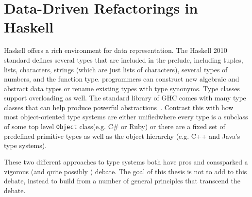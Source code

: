 \DIFdelbegin %
{%
\texttt{}%
}
\DIFdelend %
\section{Data-Driven Refactorings in Haskell}

Haskell offers a rich environment for data representation. The Haskell 2010 standard defines several types that are included in the prelude, including tuples, lists, characters, strings (which are just lists of characters), several types of numbers, and the function type. \DIFdelbegin {}\DIFdelend \DIFaddbegin {}\DIFaddend programmers can construct new \DIFdelbegin {}\DIFdelend algebraic and abstract data types or rename existing types with type synonyms. Type classes support overloading as well. The standard library of GHC comes with many type classes that can help produce powerful abstractions~\citep{typeclassopedia}. Contrast this with how most object-oriented type systems are either unified\DIFaddbegin \DIFadd{, }\DIFaddend where every type is a subclass of some top level \texttt{Object} class\DIFaddbegin \DIFadd{, }\DIFaddend (e.g. C\# or Ruby) or there are \DIFdelbegin {}\DIFdelend a fixed set of predefined primitive types as well as the object hierarchy (e.g. C++ and Java's type systems). 

These two different approaches to type systems both have pros and cons\DIFdelbegin {}\DIFdelend \DIFaddbegin {}\DIFaddend sparked a vigorous (and quite possibly \DIFdelbegin {}\DIFdelend \DIFaddbegin {}\DIFaddend ) debate. The goal of this thesis is not to add to this debate, instead \DIFaddbegin {}\DIFaddend to build from a number of general principles that transcend the debate.

